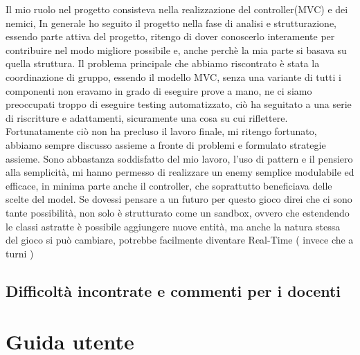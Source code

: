 \documentclass[a4paper,12pt]{report}
\begin{document}
Il mio ruolo nel progetto consisteva nella realizzazione del controller(MVC) e dei nemici,
In generale ho seguito il progetto nella fase di analisi e strutturazione, essendo parte attiva del progetto, ritengo di dover conoscerlo interamente
per contribuire nel modo migliore possibile e, anche perchè la mia parte si basava su quella struttura.
Il problema principale che abbiamo riscontrato è stata la coordinazione di gruppo, essendo il modello MVC, senza una variante di tutti i componenti non eravamo 
in grado di eseguire prove a mano, ne ci siamo preoccupati troppo di eseguire testing automatizzato, ciò ha seguitato a una serie
di riscritture e adattamenti, sicuramente una cosa su cui riflettere.
Fortunatamente ciò non ha precluso il lavoro finale, mi ritengo fortunato, abbiamo sempre discusso assieme a fronte di 
problemi e formulato strategie assieme. Sono abbastanza soddisfatto del mio lavoro, l'uso di pattern e il pensiero alla semplicità, mi hanno permesso
di realizzare un enemy semplice modulabile ed efficace, in minima parte anche il controller, che soprattutto beneficiava delle scelte del model.
Se dovessi pensare a un futuro per questo gioco direi che ci sono tante possibilità, non solo è strutturato come un sandbox, ovvero che estendendo 
le classi astratte è possibile aggiungere nuove entità, ma anche la natura stessa del gioco si può cambiare, potrebbe facilmente diventare Real-Time ( invece che a turni )
\section{Difficoltà incontrate e commenti per i docenti}

\appendix
\chapter{Guida utente}
\end{document}
